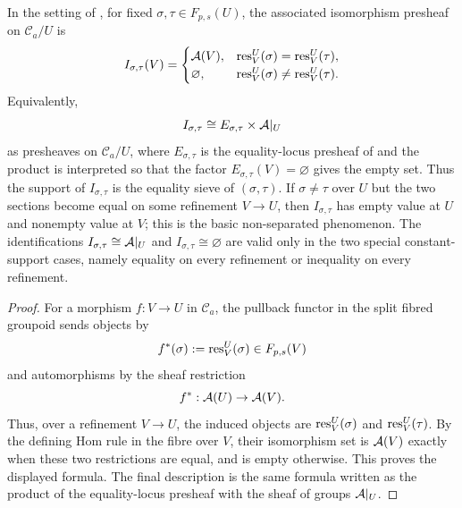 \begin{lemma}\label{lem:split-isomorphism-presheaf}
In the setting of , for fixed $\sigma,\tau\in F_{p,s}(U)$, the associated isomorphism presheaf on $\mathcal C_a/U$ is
\[
I_{\sigma,\tau}(V)=
\begin{cases}
\mathcal{A}(V), & \mathrm{res}_V^U(\sigma)=\mathrm{res}_V^U(\tau),\\
\varnothing, & \mathrm{res}_V^U(\sigma)\neq\mathrm{res}_V^U(\tau).
\end{cases}
\]
Equivalently,
\[
I_{\sigma,\tau}\cong E_{\sigma,\tau}\times \mathcal{A}|_U
\]
as presheaves on $\mathcal C_a/U$, where $E_{\sigma,\tau}$ is the equality-locus presheaf of  and the product is interpreted so that the factor $E_{\sigma,\tau}(V)=\varnothing$ gives the empty set. Thus the support of $I_{\sigma,\tau}$ is the equality sieve of $(\sigma,\tau)$. If $\sigma\neq\tau$ over $U$ but the two sections become equal on some refinement $V\to U$, then $I_{\sigma,\tau}$ has empty value at $U$ and nonempty value at $V$; this is the basic non-separated phenomenon. The identifications $I_{\sigma,\tau}\cong \mathcal{A}|_U$ and $I_{\sigma,\tau}\cong\varnothing$ are valid only in the two special constant-support cases, namely equality on every refinement or inequality on every refinement.
\end{lemma}

\begin{proof}
For a morphism $f:V\to U$ in $\mathcal C_a$, the pullback functor in the split fibred groupoid sends objects by
\[
f^*(\sigma):=\mathrm{res}_V^U(\sigma)\in F_{p,s}(V)
\]
and automorphisms by the sheaf restriction
\[
f^*:\mathcal{A}(U)\to \mathcal{A}(V).
\]
Thus, over a refinement $V\to U$, the induced objects are $\mathrm{res}_V^U(\sigma)$ and $\mathrm{res}_V^U(\tau)$. By the defining Hom rule in the fibre over $V$, their isomorphism set is $\mathcal{A}(V)$ exactly when these two restrictions are equal, and is empty otherwise. This proves the displayed formula. The final description is the same formula written as the product of the equality-locus presheaf with the sheaf of groups $\mathcal{A}|_U$.
\end{proof}

